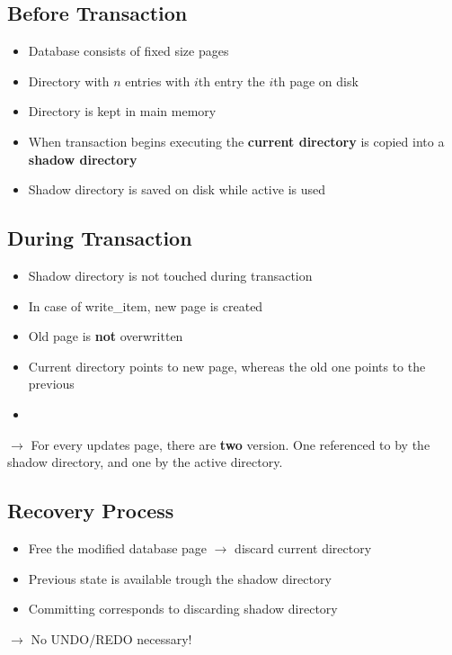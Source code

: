 \subsection{Before Transaction}
\begin{itemize}
	\item Database consists of  fixed size pages
	\item Directory with $n$ entries with $i$th entry the $i$th page on disk
	\item Directory is kept in main memory
	\item When transaction begins executing the \textbf{current directory} is copied into a \textbf{shadow directory}
	\item Shadow directory is saved on disk while active is used
\end{itemize}

\subsection{During Transaction}
\begin{itemize}
	\item Shadow directory is not touched during transaction
	\item In case of write\_item, new page is created
	\item Old page is \textbf{not} overwritten
	\item Current directory points to new page, whereas the old one points to the previous
	\item 
\end{itemize}
$\rightarrow$ For every updates page, there are \textbf{two} version. One referenced to by the shadow directory, and one by the active directory.

\subsection{Recovery Process}
\begin{itemize}
	\item Free the modified database page $\rightarrow$ discard current directory
	\item Previous state is available trough the shadow directory
	\item Committing corresponds to discarding shadow directory
\end{itemize}
$\rightarrow$ No UNDO/REDO necessary!

